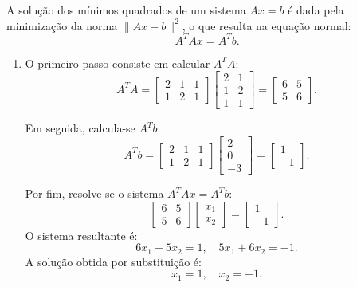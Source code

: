 \begin{resolution}
  A solução dos mínimos quadrados de um sistema \( Ax = b \) é dada pela minimização da norma \( \|Ax - b\|^2 \), o que resulta na equação normal:
  \[
    A^T A x = A^T b.
  \]

  \begin{enumerate}[label=\alph*)]
    \item O primeiro passo consiste em calcular \( A^T A \):
          \[
            A^T A = \begin{bmatrix}
              2 & 1 & 1 \\
              1 & 2 & 1
            \end{bmatrix}
            \begin{bmatrix}
              2 & 1 \\
              1 & 2 \\
              1 & 1
            \end{bmatrix} =
            \begin{bmatrix}
              6 & 5 \\
              5 & 6
            \end{bmatrix}.
          \]

          Em seguida, calcula-se \( A^T b \):
          \[
            A^T b = \begin{bmatrix}
              2 & 1 & 1 \\
              1 & 2 & 1
            \end{bmatrix}
            \begin{bmatrix}
              2 \\
              0 \\
              -3
            \end{bmatrix} =
            \begin{bmatrix}
              1 \\
              -1
            \end{bmatrix}.
          \]

          Por fim, resolve-se o sistema \( A^T A x = A^T b \):
          \[
            \begin{bmatrix}
              6 & 5 \\
              5 & 6
            \end{bmatrix}
            \begin{bmatrix}
              x_1 \\
              x_2
            \end{bmatrix} =
            \begin{bmatrix}
              1 \\
              -1
            \end{bmatrix}.
          \]
          O sistema resultante é:
          \[
            6x_1 + 5x_2 = 1, \quad 5x_1 + 6x_2 = -1.
          \]
          A solução obtida por substituição é:
          \[
            x_1 = 1, \quad x_2 = -1.
          \]


\end{enumerate}
\end{resolution}
